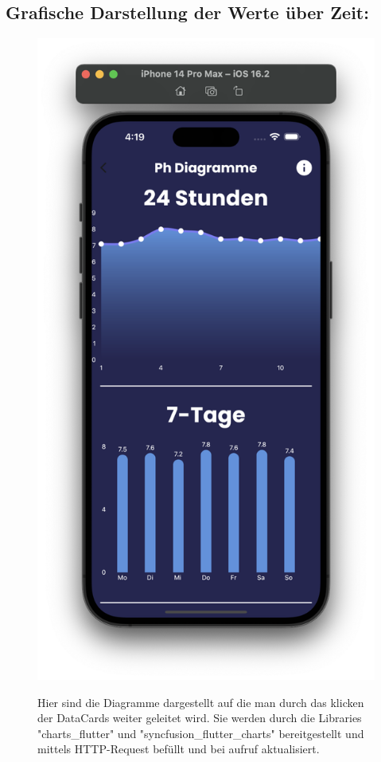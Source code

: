 \subsection*{Grafische Darstellung der Werte über Zeit:}

\begin{figure}[h!]
    \begin{minipage}[c]{0.4\textwidth}
      \includegraphics[width=\textwidth]{./pics/Diagramme1Bild.png}
    \end{minipage}
    \begin{minipage}[c]{0.5\textwidth}
      \label{fig:DigrammeApp1}
      Hier sind die Diagramme dargestellt auf die man durch das klicken der DataCards weiter geleitet wird. 
      Sie werden durch die Libraries "charts\_flutter" und "syncfusion\_flutter\_charts" bereitgestellt und mittels
      HTTP-Request befüllt und bei aufruf aktualisiert.

    \end{minipage}
\end{figure}
